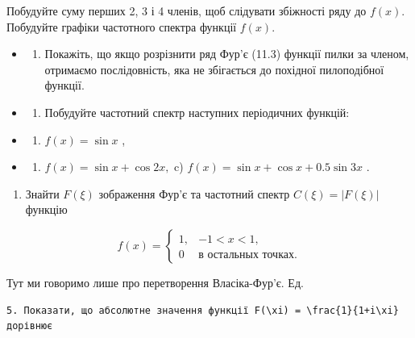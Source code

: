 \documentclass[
  ukrainian,
]{article}
\providecommand{\tightlist}{%
  \setlength{\itemsep}{0pt}\setlength{\parskip}{0pt}}
\begin{document}
Побудуйте суму перших 2, 3 і 4 членів, щоб слідувати збіжності ряду до
\(f(x)\). Побудуйте графіки частотного спектра функції \(f(x)\).

\begin{itemize}
\tightlist
\item
  \begin{enumerate}
  \def\labelenumi{\arabic{enumi}.}
  \setcounter{enumi}{1}
  \tightlist
  \item
    Покажіть, що якщо розрізнити ряд Фур'є (11.3) функції пилки за
    членом, отримаємо послідовність, яка не збігається до похідної
    пилоподібної функції.
  \end{enumerate}
\item
  \begin{enumerate}
  \def\labelenumi{\arabic{enumi}.}
  \setcounter{enumi}{2}
  \tightlist
  \item
    Побудуйте частотний спектр наступних періодичних функцій:
  \end{enumerate}
\item
  \begin{enumerate}
  \def\labelenumi{\alph{enumi})}
  \tightlist
  \item
    \(f(x) = \sin x\) ,
  \end{enumerate}
\item
  \begin{enumerate}
  \def\labelenumi{\arabic{enumi})}
  \setcounter{enumi}{5}
  \tightlist
  \item
    \(f(x) = \sin x + \cos 2x,\) c)
    \(f(x) = \sin x + \cos x + 0.5 \sin 3x\) .
  \end{enumerate}
\end{itemize}

\begin{enumerate}
\def\labelenumi{\arabic{enumi}.}
\setcounter{enumi}{3}
\tightlist
\item
  Знайти \(F(\xi)\) зображення Фур'є та частотний спектр
  \(C(\xi) = |F(\xi)|\) функцію
\end{enumerate}

\[
f(x) =
\begin{cases} 1, & -1 < x < 1, \\ 0 & \text{в остальных точках.} \end{cases}
\]

Тут ми говоримо лише про перетворення Власіка-Фур'є. Ед.

\begin{verbatim}
5. Показати, що абсолютне значення функції F(\xi) = \frac{1}{1+i\xi} дорівнює
\end{verbatim}
\end{document}
